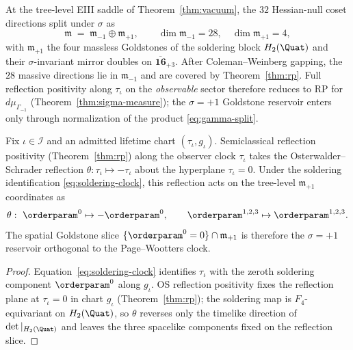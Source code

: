 \begin{lemma}
\label{lem:goldstone-sigma}
At the tree-level EIII saddle of Theorem~\ref{thm:vacuum}, the $32$
Hessian-null coset directions split under $\sigma$ as
\begin{equation}\label{eq:goldstone-split}
  \mathfrak{m}
  \;=\;
  \mathfrak{m}_{-1}\oplus\mathfrak{m}_{+1},
  \qquad
  \dim\mathfrak{m}_{-1}=28,\quad \dim\mathfrak{m}_{+1}=4,
\end{equation}
with $\mathfrak{m}_{+1}$ the four massless Goldstones of the soldering block
$H_2(\Quat)$ and their $\sigma$-invariant mirror doubles on
$\overline{\mathbf{16}}_{+3}$. After Coleman--Weinberg gapping, the
$28$ massive directions lie in $\mathfrak{m}_{-1}$ and are covered by
Theorem~\ref{thm:rp}. Full reflection positivity along $\tau_\iota$ on the
\emph{observable} sector therefore reduces to RP for $d\mu_{\Gamma_{-1}}$
(Theorem~\ref{thm:sigma-measure}); the $\sigma=+1$ Goldstone reservoir
enters only through normalization of the product \eqref{eq:gamma-split}.
\end{lemma}

\begin{proposition}
\label{prop:goldstone-rp-plane}
Fix $\iota\in\mathcal{I}$ and an admitted lifetime chart
$(\tau_\iota,g_\iota)$. Semiclassical reflection positivity (Theorem~\ref{thm:rp}) along the observer clock
$\tau_\iota$ takes the Osterwalder--Schrader reflection
$\theta:\tau_\iota\mapsto-\tau_\iota$ about the hyperplane $\tau_\iota=0$.
Under the soldering identification \eqref{eq:soldering-clock}, this
reflection acts on the tree-level $\mathfrak{m}_{+1}$ coordinates as
\begin{equation}\label{eq:goldstone-reflection}
  \theta:\ \orderparam^0\mapsto-\orderparam^0,
  \qquad
  \orderparam^{1,2,3}\mapsto\orderparam^{1,2,3}.
\end{equation}
The spatial Goldstone slice
$\{\orderparam^0=0\}\cap\mathfrak{m}_{+1}$ is therefore the
$\sigma=+1$ reservoir orthogonal to the Page--Wootters clock.
\end{proposition}

\begin{proof}
Equation~\eqref{eq:soldering-clock} identifies $\tau_\iota$ with the
zeroth soldering component $\orderparam^0$ along $g_\iota$. OS reflection
positivity fixes the reflection plane at $\tau_\iota=0$ in chart $g_\iota$
(Theorem~\ref{thm:rp}); the soldering map is $F_4$-equivariant on
$H_2(\Quat)$, so $\theta$ reverses only the timelike direction of
$\det|_{H_2(\Quat)}$ and leaves the three spacelike components fixed on the
reflection slice.
\end{proof}

